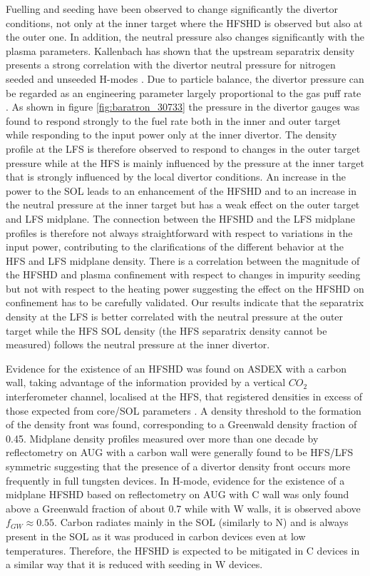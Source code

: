 \documentclass[12pt]{iopart}
\begin{document}
Fuelling and seeding have been observed to change significantly the divertor conditions, not only at the inner target where the HFSHD is observed but also at the outer one. In addition, the neutral pressure also changes significantly with the plasma parameters.
Kallenbach has shown that the upstream separatrix density presents a strong correlation with the divertor neutral pressure for nitrogen seeded and unseeded H-modes \cite{kallenbach2018parameter}.
Due to particle balance, the divertor pressure can be regarded as an engineering parameter largely proportional to the gas puff rate \cite{kallenbach2018parameter}. As shown in figure \ref{fig:baratron_30733} the pressure in the divertor gauges was found to respond strongly to the fuel rate both in the inner and outer target while responding to the input power only at the inner divertor. The density profile at the LFS is therefore observed to respond to changes in the outer target pressure while at the HFS is mainly influenced by the pressure at the inner target that is strongly influenced by the local divertor conditions. An increase in the power to the SOL leads to an enhancement of the HFSHD and to an increase in the neutral pressure at the inner target but has a weak effect on the outer target and LFS midplane.  The connection between the HFSHD and the LFS midplane profiles is therefore not always straightforward with respect to variations in the input power, contributing to the clarifications of the different behavior at the HFS and LFS midplane density.  
There is a correlation between the magnitude of the HFSHD and plasma confinement with respect to changes in impurity seeding but not with respect to the heating power suggesting the effect on the HFSHD on confinement has to be carefully validated. Our results indicate that the separatrix density at the LFS is better correlated with the neutral pressure at the outer target while the HFS SOL density (the HFS separatrix density cannot be measured) follows the neutral pressure at the inner divertor.   

Evidence for the existence of an HFSHD was found on ASDEX with a carbon wall, taking advantage of the information provided by a vertical $CO_2$ interferometer channel, localised at the HFS, that registered densities in excess of those expected from core/SOL parameters \cite{mccormick2009main}. A density threshold to the formation of the density front was found, corresponding to a Greenwald density fraction of 0.45. Midplane density profiles measured over more than one decade by reflectometry on AUG with a carbon wall were generally found to be HFS/LFS symmetric suggesting that the presence of a divertor density front occurs more frequently in full tungsten devices. In H-mode, evidence for the existence of a midplane HFSHD based on reflectometry on AUG with C wall was only found above a Greenwald fraction of about 0.7 while with W walls, it is observed above $f_{GW} \approx 0.55$. Carbon radiates mainly in the SOL (similarly to N) and is always present in the SOL as it was produced in carbon devices even at low temperatures. Therefore, the HFSHD is expected to be mitigated in C devices in a similar way that it is reduced with seeding in W devices.
\end{document}
